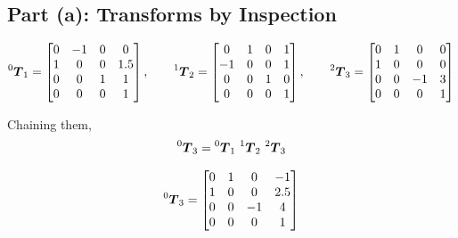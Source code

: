 \documentclass[11pt]{article}
\newcommand{\T}{\bm{T}}
\begin{document}
\subsection*{Part (a): Transforms by Inspection}
\begin{result}
\[
    \prescript{0}{}{\T}_{1} = \begin{bmatrix}
        0 & -1 & 0 & 0\\
        1 & 0 & 0 & 1.5\\
        0 & 0 & 1 & 1\\
        0 & 0 & 0 & 1
    \end{bmatrix},\qquad
    \prescript{1}{}{\T}_{2} = \begin{bmatrix}
        0 & 1 & 0 & 1\\
        -1 & 0 & 0 & 1\\
        0 & 0 & 1 & 0\\
        0 & 0 & 0 & 1
    \end{bmatrix},\qquad
    \prescript{2}{}{\T}_{3} = \begin{bmatrix}
        0 & 1 & 0 & 0\\
        1 & 0 & 0 & 0\\
        0 & 0 & -1 & 3\\
        0 & 0 & 0 & 1
    \end{bmatrix}
\]
\end{result}
Chaining them,
\[
    \prescript{0}{}{\T}_{3} = \prescript{0}{}{\T}_{1}\,\prescript{1}{}{\T}_{2}\,\prescript{2}{}{\T}_{3}
\]
\begin{result}
\[
    \prescript{0}{}{\T}_{3} = \begin{bmatrix}
        0 & 1 & 0 & -1\\
        1 & 0 & 0 & 2.5\\
        0 & 0 & -1 & 4\\
        0 & 0 & 0 & 1
    \end{bmatrix}
\]
\end{result}
\end{document}
